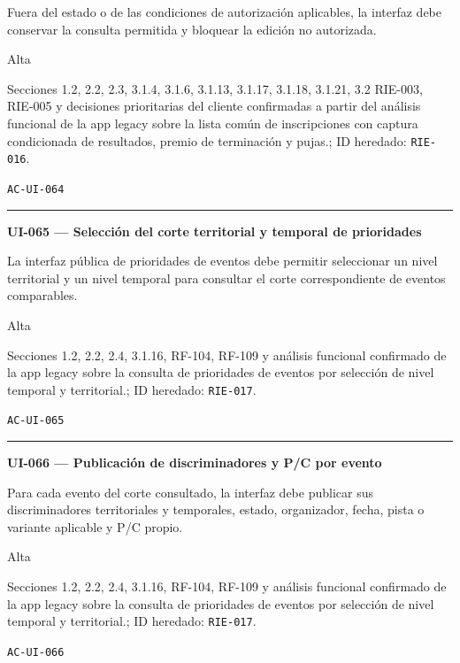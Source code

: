 \documentclass[10pt,letterpaper]{article}
\begin{document}
\begin{description}[style=nextline,leftmargin=3.15cm,labelwidth=2.8cm,font=\normalfont\bfseries]
\item[Obligación] Fuera del estado o de las condiciones de autorización aplicables, la interfaz debe conservar la consulta permitida y bloquear la edición no autorizada.
\item[Prioridad] Alta
\item[Procedencia] Secciones 1.2, 2.2, 2.3, 3.1.4, 3.1.6, 3.1.13, 3.1.17, 3.1.18, 3.1.21, 3.2 RIE-003, RIE-005 y decisiones prioritarias del cliente confirmadas a partir del análisis funcional de la app legacy sobre la lista común de inscripciones con captura condicionada de resultados, premio de terminación y pujas.; ID heredado: \texttt{RIE-016}.
\item[Verificación] \texttt{AC-UI-064}
\end{description}
\vspace{0.25em}\hrule\vspace{0.65em}
\noindent\textbf{UI-065 --- Selección del corte territorial y temporal de prioridades}\par
\begin{description}[style=nextline,leftmargin=3.15cm,labelwidth=2.8cm,font=\normalfont\bfseries]
\item[Obligación] La interfaz pública de prioridades de eventos debe permitir seleccionar un nivel territorial y un nivel temporal para consultar el corte correspondiente de eventos comparables.
\item[Prioridad] Alta
\item[Procedencia] Secciones 1.2, 2.2, 2.4, 3.1.16, RF-104, RF-109 y análisis funcional confirmado de la app legacy sobre la consulta de prioridades de eventos por selección de nivel temporal y territorial.; ID heredado: \texttt{RIE-017}.
\item[Verificación] \texttt{AC-UI-065}
\end{description}
\vspace{0.25em}\hrule\vspace{0.65em}
\noindent\textbf{UI-066 --- Publicación de discriminadores y P/C por evento}\par
\begin{description}[style=nextline,leftmargin=3.15cm,labelwidth=2.8cm,font=\normalfont\bfseries]
\item[Obligación] Para cada evento del corte consultado, la interfaz debe publicar sus discriminadores territoriales y temporales, estado, organizador, fecha, pista o variante aplicable y P/C propio.
\item[Prioridad] Alta
\item[Procedencia] Secciones 1.2, 2.2, 2.4, 3.1.16, RF-104, RF-109 y análisis funcional confirmado de la app legacy sobre la consulta de prioridades de eventos por selección de nivel temporal y territorial.; ID heredado: \texttt{RIE-017}.
\item[Verificación] \texttt{AC-UI-066}
\end{description}
\end{document}

